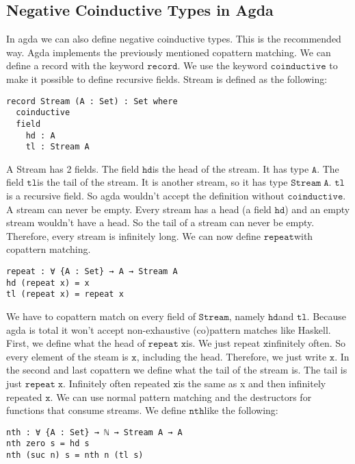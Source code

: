 \documentclass[a4paper,cleardoubleempty,BCOR1cm]{scrbook}
\begin{document}
\subsection{Negative Coinductive Types in Agda}
\label{sec:org2b35864}
In agda we can also define negative coinductive types.  This is the
recommended way.  Agda implements the previously mentioned copattern matching.
We can define a record with the keyword $\mathtt{record}$.  We use the keyword $\mathtt{coinductive}$
to make it possible to define recursive fields.  Stream is defined as the
following:

\begin{verbatim}
record Stream (A : Set) : Set where
  coinductive
  field
    hd : A
    tl : Stream A
\end{verbatim}

A Stream has 2 fields. The field $\mathtt{hd}$\;is the head of the stream. It has type
$\mathtt{A}$. The field $\mathtt{tl}$\;is the tail of the stream. It is another stream, so it
has type $\mathtt{Stream\;A}$. $\mathtt{tl}$\;is a recursive field. So agda wouldn't accept the
definition without $\mathtt{coinductive}$. A stream can never be empty. Every stream
has a head (a field $\mathtt{hd}$) and an empty stream wouldn't have a head. So the
tail of a stream can never be empty. Therefore, every stream is infinitely
long. We can now define $\mathtt{repeat}$\;with copattern matching.

\begin{verbatim}
repeat : ∀ {A : Set} → A → Stream A
hd (repeat x) = x
tl (repeat x) = repeat x
\end{verbatim}

We have to copattern match on every field of $\mathtt{Stream}$, namely $\mathtt{hd}$\;and $\mathtt{tl}$.
Because agda is total it won't accept non-exhaustive (co)pattern matches
like Haskell.  First, we define what the head of $\mathtt{repeat\;x}$\;is.  We just
repeat $\mathtt{x}$\;infinitely often.  So every element of the steam is $\mathtt{x}$, including
the head.  Therefore, we just write $\mathtt{x}$.  In the second and last copattern we
define what the tail of the stream is.  The tail is just $\mathtt{repeat\;x}$.
Infinitely often repeated $\mathtt{x}$\;is the same as x and then infinitely repeated
$\mathtt{x}$.  We can use normal pattern matching and the destructors for functions
that consume streams.  We define $\mathtt{nth}$\;like the following:

\begin{verbatim}
nth : ∀ {A : Set} → ℕ → Stream A → A
nth zero s = hd s
nth (suc n) s = nth n (tl s)
\end{verbatim}
\end{document}
